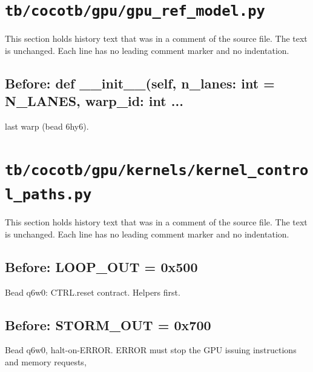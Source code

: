 \section{\texttt{tb/cocotb/gpu/gpu\_ref\_model.py}}\label{cr:suite:gpu-gpu-ref-model}

This section holds history text that was in a comment of the source file. The text is unchanged. Each line has no leading comment marker and no indentation.

\begin{record}

\subsection*{Before: def \_\_init\_\_(self, n\_lanes: int = N\_LANES, warp\_id: int ...}

\begin{textblock}
last warp (bead 6hy6).
\end{textblock}

\end{record}

\section{\texttt{tb/cocotb/gpu/kernels/kernel\_control\_paths.py}}\label{cr:suite:gpu-kernels-kernel-control-paths}

This section holds history text that was in a comment of the source file. The text is unchanged. Each line has no leading comment marker and no indentation.

\begin{record}

\subsection*{Before: LOOP\_OUT = 0x500}

\begin{textblock}
Bead q6w0: CTRL.reset contract.  Helpers first.
\end{textblock}

\subsection*{Before: STORM\_OUT = 0x700}

\begin{textblock}
Bead q6w0, halt-on-ERROR.  ERROR must stop the GPU issuing instructions and memory requests,
\end{textblock}

\end{record}

